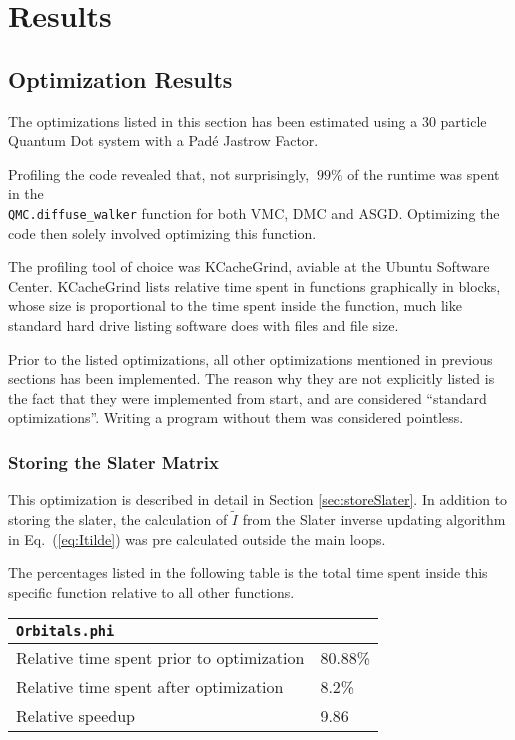 \chapter{Results}

\section{Optimization Results}

The optimizations listed in this section has been estimated using a $30$ particle Quantum Dot system with a Padé Jastrow Factor.

Profiling the code revealed that, not surprisingly, $~99\%$ of the runtime was spent in the \\\verb+QMC.diffuse_walker+ function for both VMC, DMC and ASGD. Optimizing the code then solely involved optimizing this function. 

The profiling tool of choice was KCacheGrind, aviable at the Ubuntu Software Center. KCacheGrind lists relative time spent in functions graphically in blocks, whose size is proportional to the time spent inside the function, much like standard hard drive listing software does with files and file size.

Prior to the listed optimizations, all other optimizations mentioned in previous sections has been implemented. The reason why they are not explicitly listed is the fact that they were implemented from start, and are considered ``standard optimizations''. Writing a program without them was considered pointless. 

\subsection{Storing the Slater Matrix}

This optimization is described in detail in Section \ref{sec:storeSlater}. In addition to storing the slater, the calculation of $\tilde I$ from the Slater inverse updating algorithm in Eq.~(\ref{eq:Itilde}) was pre calculated outside the main loops.

The percentages listed in the following table is the total time spent inside this specific function relative to all other functions. 

\begin{tabular}{ll}
 \verb+Orbitals.phi+ & \\
 \hline\hline
 Relative time spent prior to optimization & 80.88\% \\
 Relative time spent after optimization    & 8.2\% \\
 \hline
 Relative speedup                          & 9.86
\end{tabular}

